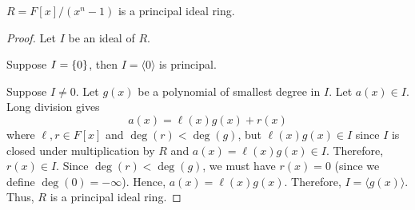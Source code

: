 \begin{Theorem}{}{}
    $ R=F[x]/(x^n-1) $ is a principal ideal ring.
\end{Theorem}

\begin{proof}
    Let $ I $ be an ideal of $ R $.

    Suppose $ I=\{0\} $, then $ I=\langle 0\rangle $ is principal.

    Suppose $ I\neq 0 $. Let $ g(x) $ be a polynomial of smallest
    degree in $ I $. Let $ a(x)\in I $. Long division
    gives
    \[ a(x)=\ell(x)g(x)+r(x) \]
    where $ \ell,r\in F[x] $ and $ \deg(r)<\deg(g) $, but $ \ell(x)g(x)\in I $
    since $ I $ is closed under multiplication by $ R $ and
    $ a(x)=\ell(x)g(x)\in I $. Therefore, $ r(x)\in I $.
    Since $ \deg(r) <\deg(g) $, we must have $ r(x)=0 $ (since we define
    $ \deg(0)=-\infty $). Hence, $ a(x)=\ell(x)g(x) $. Therefore,
    $ I=\langle g(x) \rangle $. Thus, $ R $ is a principal ideal ring.
\end{proof}
